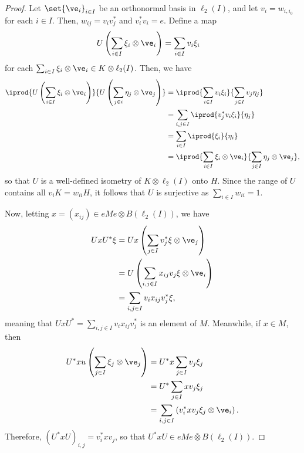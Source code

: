 \documentclass[10pt]{mypackage}
\begin{document}
\begin{proof}
  Let $\set{\ve_i}_{i\in I}$ be an orthonormal basis in $\ell_2(I)$, and let $v_i = w_{i,i_0}$ for each $i\in I$. Then, $w_{ij} = v_iv_j^{\ast}$ and $v_i^{\ast}v_i = e$. Define a map
  \begin{align*}
    U\left( \sum_{i\in I}\xi_i\otimes \ve_i \right) &= \sum_{i\in I}v_i\xi_i
  \end{align*}
  for each $\sum_{i\in I}\xi_i\otimes \ve_i\in K\otimes \ell_2(I)$. Then, we have
  \begin{align*}
    \iprod{U\left( \sum_{i\in I}\xi_i\otimes \ve_i \right)}{U\left( \sum_{j\in i}\eta_j\otimes \ve_j \right)} &= \iprod{\sum_{i\in I}v_i\xi_i}{\sum_{j\in I}v_j\eta_j}\\
                                                                                                              &= \sum_{i,j\in I} \iprod{v_j^{\ast}v_i\xi_i}{\eta_j}\\
                                                                                                              &= \sum_{i\in I} \iprod{\xi_i}{\eta_i}\\
                                                                                                              &= \iprod{\sum_{i\in I}\xi_i\otimes \ve_i}{\sum_{j\in I}\eta_j\otimes \ve_j},
  \end{align*}
  so that $U$ is a well-defined isometry of $K\otimes \ell_2(I)$ onto $H$. Since the range of $U$ contains all $v_iK = w_{ii}H$, it follows that $U$ is surjective as $\sum_{i\in I}w_{ii} = 1$.

  Now, letting $x = \left( x_{ij} \right)\in eMe\otimes B\left( \ell_2(I) \right)$, we have
  \begin{align*}
    UxU^{\ast}\xi &= Ux\left( \sum_{j\in I}v_j^{\ast}\xi\otimes \ve_j \right)\\
                  &= U\left( \sum_{i,j\in I}x_{ij}v_j\xi\otimes \ve_i \right)\\
                  &= \sum_{i,j\in I}v_ix_{ij}v_j^{\ast}\xi,
  \end{align*}
  meaning that $UxU^{\ast} = \sum_{i,j\in I}v_ix_{ij}v_j^{\ast}$ is an element of $M$. Meanwhile, if $x\in M$, then
  \begin{align*}
    U^{\ast}xu\left( \sum_{j\in I}\xi_j\otimes \ve_j \right) &= U^{\ast}x\sum_{j\in I}v_j\xi_j\\
                                                             &= U^{\ast}\sum_{j\in I}xv_j\xi_j\\
                                                             &= \sum_{i,j\in I} \left( v_i^{\ast}xv_j\xi_j\otimes \ve_i \right).
  \end{align*}
  Therefore, $\left( U^{\ast}xU \right)_{i,j} = v_i^{\ast}xv_j$, so that $U^{\ast}xU\in eMe\bar\otimes B\left( \ell_2(I) \right)$.
\end{proof}
\end{document}
